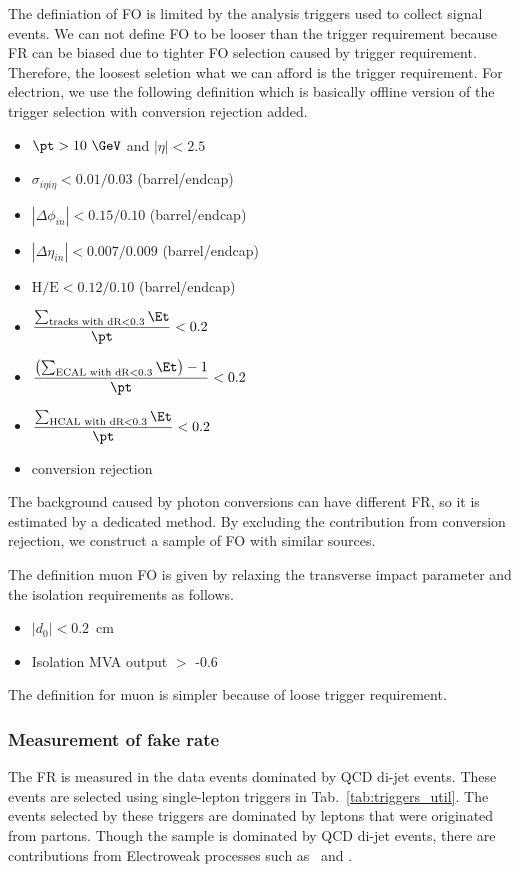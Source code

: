 The definiation of FO is limited by the analysis triggers used to collect signal events. 
We can not define FO to be looser than the trigger requirement because FR can be 
biased due to tighter FO selection caused by trigger requirement. Therefore, the 
loosest seletion what we can afford is the trigger requirement. For electrion,  
we use the following definition which is basically offline version of the trigger selection
with conversion rejection added. 
\begin{itemize}
  \item $\pt>10~\GeV$ and $|\eta| < 2.5$
  \item $\sigma_{i\eta i\eta} < 0.01/0.03$ (barrel/endcap)
  \item $|\Delta\phi_{in}| < 0.15/0.10$ (barrel/endcap)
  \item $|\Delta\eta_{in}| < 0.007/0.009$ (barrel/endcap)
  \item $\textrm{H/E}< 0.12/0.10$ (barrel/endcap)
  \item $\displaystyle \frac{\sum_{\textrm{tracks with dR}<0.3}\Et}{\pt}<0.2$
  \item $\displaystyle \frac{\left(\sum_{\textrm{ECAL with dR}<0.3}\Et\right)-1}{\pt}<0.2$
  \item $\displaystyle \frac{\sum_{\textrm{HCAL with dR}<0.3}\Et}{\pt}<0.2$
  \item conversion rejection 
\end{itemize}
The background caused by photon conversions 
can have different FR, so it is estimated by a dedicated method.  
By excluding the contribution from conversion rejection, we construct 
a sample of FO with similar sources. 

The definition muon FO is given by relaxing the transverse impact parameter and 
the isolation requirements as follows. 
\begin{itemize}
    \item $\left|d_0\right| < 0.2$~cm
    \item Isolation MVA output $>$ -0.6
\end{itemize}
The definition for muon is simpler because of loose trigger requirement. 

\subsubsection{Measurement of fake rate}

The FR is measured in the data events dominated by QCD di-jet events. 
These events are selected using single-lepton triggers in Tab.~\ref{tab:triggers_util}.
The events selected by these triggers are dominated by leptons that 
were originated from partons. Though the sample is dominated by QCD di-jet 
events, there are contributions from Electroweak processes such as \Wjets\ and \dyll. 

